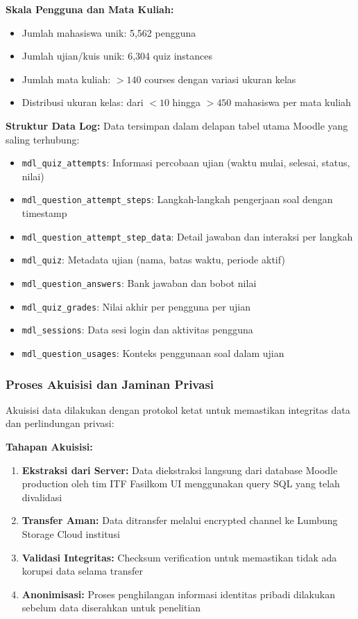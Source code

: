 \textbf{Skala Pengguna dan Mata Kuliah:}
\begin{itemize}
    \item Jumlah mahasiswa unik: 5,562 pengguna
    \item Jumlah ujian/kuis unik: 6,304 quiz instances
    \item Jumlah mata kuliah: $>140$ courses dengan variasi ukuran kelas
    \item Distribusi ukuran kelas: dari $<10$ hingga $>450$ mahasiswa per mata kuliah
\end{itemize}

\textbf{Struktur Data Log:}
Data tersimpan dalam delapan tabel utama Moodle yang saling terhubung:
\begin{itemize}
    \item \texttt{mdl\_quiz\_attempts}: Informasi percobaan ujian (waktu mulai, selesai, status, nilai)
    \item \texttt{mdl\_question\_attempt\_steps}: Langkah-langkah pengerjaan soal dengan timestamp
    \item \texttt{mdl\_question\_attempt\_step\_data}: Detail jawaban dan interaksi per langkah
    \item \texttt{mdl\_quiz}: Metadata ujian (nama, batas waktu, periode aktif)
    \item \texttt{mdl\_question\_answers}: Bank jawaban dan bobot nilai
    \item \texttt{mdl\_quiz\_grades}: Nilai akhir per pengguna per ujian
    \item \texttt{mdl\_sessions}: Data sesi login dan aktivitas pengguna
    \item \texttt{mdl\_question\_usages}: Konteks penggunaan soal dalam ujian
\end{itemize}

\subsubsection{Proses Akuisisi dan Jaminan Privasi}
\label{sec:prosesAkuisisiPrivasi}

Akuisisi data dilakukan dengan protokol ketat untuk memastikan integritas data dan perlindungan privasi:

\textbf{Tahapan Akuisisi:}
\begin{enumerate}
    \item \textbf{Ekstraksi dari Server:} Data diekstraksi langsung dari database Moodle production oleh tim ITF Fasilkom UI menggunakan query SQL yang telah divalidasi
    \item \textbf{Transfer Aman:} Data ditransfer melalui encrypted channel ke Lumbung Storage Cloud institusi
    \item \textbf{Validasi Integritas:} Checksum verification untuk memastikan tidak ada korupsi data selama transfer
    \item \textbf{Anonimisasi:} Proses penghilangan informasi identitas pribadi dilakukan sebelum data diserahkan untuk penelitian
\end{enumerate}

